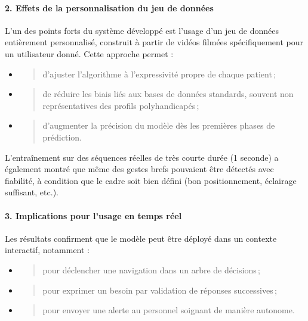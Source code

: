 \documentclass[
]{article}
\begin{document}
\hypertarget{effets-de-la-personnalisation-du-jeu-de-donnuxe9es}{%
\paragraph{\texorpdfstring{\textbf{2. Effets de la personnalisation du jeu de données}}{2. Effets de la personnalisation du jeu de données}}\label{effets-de-la-personnalisation-du-jeu-de-donnuxe9es}}

L'un des points forts du système développé est l'usage d'un jeu de données entièrement personnalisé, construit à partir de vidéos filmées spécifiquement pour un utilisateur donné. Cette approche permet :

\begin{itemize}
\item
  \begin{quote}
  d'ajuster l'algorithme à l'expressivité propre de chaque patient\,;
  \end{quote}
\item
  \begin{quote}
  de réduire les biais liés aux bases de données standards, souvent non représentatives des profils polyhandicapés\,;
  \end{quote}
\item
  \begin{quote}
  d'augmenter la précision du modèle dès les premières phases de prédiction.
  \end{quote}
\end{itemize}

L'entraînement sur des séquences réelles de très courte durée (1 seconde) a également montré que même des gestes brefs pouvaient être détectés avec fiabilité, à condition que le cadre soit bien défini (bon positionnement, éclairage suffisant, etc.).

\hypertarget{implications-pour-lusage-en-temps-ruxe9el}{%
\paragraph{\texorpdfstring{\textbf{3. Implications pour l'usage en temps réel}}{3. Implications pour l'usage en temps réel}}\label{implications-pour-lusage-en-temps-ruxe9el}}

Les résultats confirment que le modèle peut être déployé dans un contexte interactif, notamment :

\begin{itemize}
\item
  \begin{quote}
  pour déclencher une navigation dans un arbre de décisions\,;
  \end{quote}
\item
  \begin{quote}
  pour exprimer un besoin par validation de réponses successives\,;
  \end{quote}
\item
  \begin{quote}
  pour envoyer une alerte au personnel soignant de manière autonome.
  \end{quote}
\end{itemize}
\end{document}
